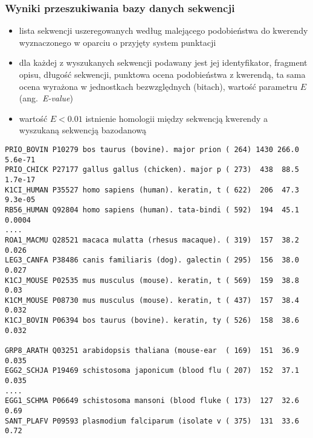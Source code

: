 \begin{frame}[fragile]
\frametitle{Wyniki przeszukiwania bazy danych sekwencji}

\raggedright\scriptsize
\begin{itemize}
 \item lista sekwencji uszeregowanych według malejącego podobieństwa
 do kwerendy wyznaczonego w oparciu o przyjęty system punktacji

 \item dla każdej z wyszukanych sekwencji podawany jest jej
 identyfikator, fragment opisu, długość sekwencji, punktowa ocena
 podobieństwa z kwerendą, ta sama ocena wyrażona w jednostkach
 bezwzględnych (bitach), wartość parametru $E$ (ang.\ \emph{E-value})

 \item wartość $E < 0.01$  istnienie homologii między
 sekwencją kwerendy a wyszukaną sekwencją bazodanową
\end{itemize}

\begin{center}
\begin{BVerbatim}[fontsize=\tiny]
PRIO_BOVIN P10279 bos taurus (bovine). major prion ( 264) 1430 266.0 5.6e-71
PRIO_CHICK P27177 gallus gallus (chicken). major p ( 273)  438  88.5 1.7e-17
K1CI_HUMAN P35527 homo sapiens (human). keratin, t ( 622)  206  47.3 9.3e-05
RB56_HUMAN Q92804 homo sapiens (human). tata-bindi ( 592)  194  45.1  0.0004
....
ROA1_MACMU Q28521 macaca mulatta (rhesus macaque). ( 319)  157  38.2   0.026
LEG3_CANFA P38486 canis familiaris (dog). galectin ( 295)  156  38.0   0.027
K1CJ_MOUSE P02535 mus musculus (mouse). keratin, t ( 569)  159  38.8    0.03
K1CM_MOUSE P08730 mus musculus (mouse). keratin, t ( 437)  157  38.4   0.032
K1CJ_BOVIN P06394 bos taurus (bovine). keratin, ty ( 526)  158  38.6   0.032

GRP8_ARATH Q03251 arabidopsis thaliana (mouse-ear  ( 169)  151  36.9   0.035
EGG2_SCHJA P19469 schistosoma japonicum (blood flu ( 207)  152  37.1   0.035
....
EGG1_SCHMA P06649 schistosoma mansoni (blood fluke ( 173)  127  32.6    0.69
SANT_PLAFV P09593 plasmodium falciparum (isolate v ( 375)  131  33.6    0.72
\end{BVerbatim}
\end{center}\vfill~
\end{frame}


